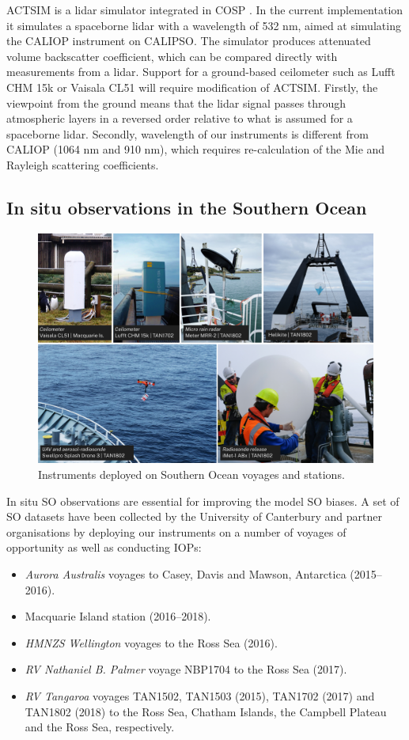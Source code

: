 ACTSIM is a lidar simulator integrated in COSP
\citep{chepfer2008,chiriaco2006}. In the current implementation it simulates a
spaceborne lidar with a wavelength of 532 nm, aimed at simulating the CALIOP
instrument on CALIPSO. The simulator produces attenuated volume backscatter
coefficient, which can be compared directly with measurements from a lidar.
Support for a ground-based ceilometer such as Lufft CHM 15k or Vaisala CL51
will require modification of ACTSIM. Firstly, the viewpoint from
the ground means that the lidar signal passes through atmospheric layers in a reversed
order relative to what is assumed for a spaceborne lidar. Secondly,
wavelength of our instruments is different from CALIOP (1064 nm and 910 nm),
which requires re-calculation of the Mie and Rayleigh scattering coefficients.

\subsection{In situ observations in the Southern Ocean}

\begin{figure}[t]
\centering
\includegraphics[width=\textwidth]{fig/instruments.jpg}
\caption{
Instruments deployed on Southern Ocean voyages and stations.
}
\label{fig:instruments}
\end{figure}

In situ SO observations are essential for improving the model SO biases.
A set of SO datasets have been collected by the University of Canterbury
and partner organisations by deploying our instruments on a number
of voyages of opportunity as well as conducting IOPs:

\begin{itemize}
\item \textit{Aurora Australis} voyages to Casey, Davis and Mawson, Antarctica (2015--2016).
\item Macquarie Island station (2016--2018).
\item \textit{HMNZS Wellington} voyages to the Ross Sea (2016).
\item \textit{RV Nathaniel B. Palmer} voyage NBP1704 to the Ross Sea (2017).
\item \textit{RV Tangaroa} voyages TAN1502, TAN1503 (2015), TAN1702 (2017) and TAN1802 (2018)
to the Ross Sea, Chatham Islands, the Campbell Plateau and the Ross Sea, respectively.
\end{itemize}

